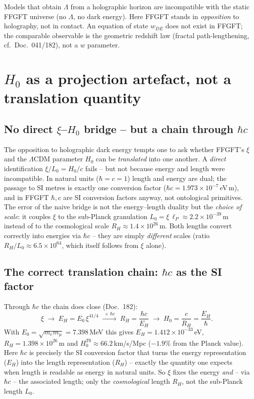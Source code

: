 Models that obtain $\Lambda$ from a holographic horizon are incompatible with
the static FFGFT universe (no $\Lambda$, no dark energy). Here FFGFT stands in
\emph{opposition} to holography, not in contact. An equation of state
$w_{DE}$ does not exist in FFGFT; the comparable observable is the geometric
redshift law (fractal path-lengthening, cf.\ Doc.~041/182), not a
$w$ parameter.

\section{\texorpdfstring{$H_0$ as a projection artefact, not a translation quantity}{H0 as a projection artefact, not a translation quantity}}

\subsection*{No direct \texorpdfstring{$\xi$}{xi}--\texorpdfstring{$H_0$}{H0} bridge -- but a chain through \texorpdfstring{$\hbar c$}{hbar c}}

The opposition to holographic dark energy tempts one to ask whether FFGFT's
$\xi$ and the $\Lambda$CDM parameter $H_0$ can be \emph{translated} into one
another. A \emph{direct} identification $\xi/L_0 = H_0/c$ fails -- but not
because energy and length were incompatible. In natural units ($\hbar = c =
1$) length and energy are dual; the passage to SI metres is exactly one
conversion factor ($\hbar c = 1.973\times10^{-7}$\,eV\,m), and in FFGFT
$\hbar, c$ are SI conversion factors anyway, not ontological primitives. The
error of the naive bridge is not the energy--length duality but the
\emph{choice of scale}: it couples $\xi$ to the sub-Planck granulation
$L_0 = \xi\,\ell_P \approx 2.2\times10^{-39}$\,m instead of to the cosmological
scale $R_H \approx 1.4\times10^{26}$\,m. Both lengths convert correctly into
energies via $\hbar c$ -- they are simply \emph{different} scales (ratio
$R_H/L_0 \approx 6.5\times10^{64}$, which itself follows from $\xi$ alone).

\subsection*{The correct translation chain: $\hbar c$ as the SI factor}

Through $\hbar c$ the chain does close (Doc.~182):
\[
  \xi \;\longrightarrow\; E_H = E_0\,\xi^{41/4}
  \;\xrightarrow{\;\times\,\hbar c\;}\; R_H = \frac{\hbar c}{E_H}
  \;\longrightarrow\; H_0 = \frac{c}{R_H} = \frac{E_H}{\hbar}.
\]
With $E_0 = \sqrt{m_e m_\mu} = 7.398$\,MeV this gives $E_H = 1.412\times
10^{-33}$\,eV, $R_H = 1.398\times10^{26}$\,m and $H_0^{T0} \approx
66.2$\,km/s/Mpc ($-1.9\%$ from the Planck value). Here $\hbar c$ is precisely
the SI conversion factor that turns the energy representation ($E_H$) into the
length representation ($R_H$) -- exactly the quantity one expects when length
is readable as energy in natural units. So $\xi$ fixes the energy \emph{and} --
via $\hbar c$ -- the associated length; only the \emph{cosmological} length
$R_H$, not the sub-Planck length $L_0$.

